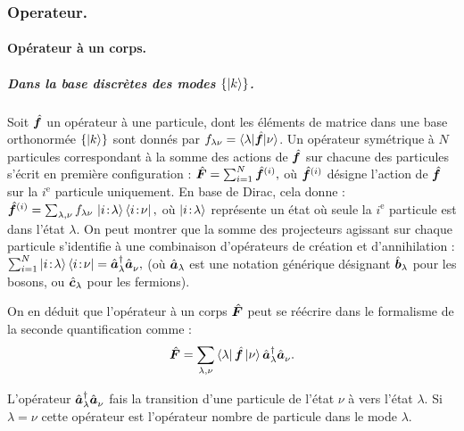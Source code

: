 \subsubsection{Operateur. }


\paragraph{Opérateur à un corps.}

\subparagraph{Dans la base discrètes des modes \( \{ \ket{k} \} \).}

Soit \( \hat{\bm{f}} \) un opérateur à une particule, dont les éléments de matrice dans une base orthonormée \( \{ \ket{k} \} \) sont donnés par \( f_{\lambda\nu} = \langle \lambda \vert \hat{\bm{f}} \vert \nu \rangle \). Un opérateur symétrique à \( N \) particules correspondant à la somme des actions de \( \hat{\bm{f}} \) sur chacune des particules s’écrit en première configuration  :
\(
	\hat{\bm{F}} = \sum_{i=1}^N \hat{\bm{f}}^{(i)},
\)
où \( \hat{\bm{f}}^{(i)} \) désigne l’action de \( \hat{\bm{f}} \) sur la $i^\text{e}$ particule uniquement. En base de Dirac, cela donne :
\(
	\hat{\bm{f}}^{(i)} = \sum_{\lambda, \nu} f_{\lambda\nu} \, \ket{i\!:\!\lambda} \bra{i\!:\!\nu},
\)
où \( \ket{i\!:\!\lambda} \) représente un état où seule la $i^\text{e}$ particule est dans l’état \( \lambda \). %
On peut montrer que la somme des projecteurs agissant sur chaque particule s’identifie à une combinaison d’opérateurs de création et d’annihilation :
\(
	\sum_{i=1}^N \ket{i\!:\!\lambda} \bra{i\!:\!\nu} = \hat{\bm{a}}^\dagger_\lambda \hat{\bm{a}}_\nu^{},
\)
(où \( \hat{\bm{a}}_\lambda \) est une notation générique désignant \( \hat{\bm{b}}_\lambda \) pour les bosons, ou \( \hat{\bm{c}}_\lambda \) pour les fermions).

On en déduit que l’opérateur à un corps \( \hat{\bm{F}} \) peut se réécrire dans le formalisme de la seconde quantification comme :
\begin{eqnarray}\label{chap.1:eq.rapel.opp.1.prim.1}
	\hat{\bm{F}} = \sum_{\lambda, \nu} \bra{\lambda} \hat{\bm{f}} \ket{\nu} \hat{\bm{a}}^\dagger_\lambda \hat{\bm{a}}_\nu^{}.
\end{eqnarray}

L'opérateur $\hat{\bm{a}}^\dagger_\lambda \hat{\bm{a}}_\nu^{}$ fais la transition d'une particule de l'état $\nu$ à vers l'état $\lambda$. Si $\lambda = \nu$ cette opérateur est l'opérateur nombre de particule dans le mode $\lambda$.


